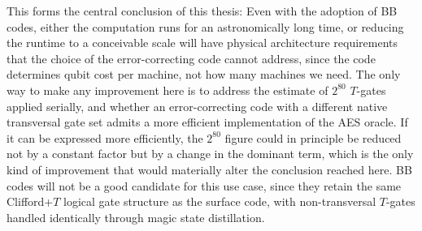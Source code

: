 This forms the central conclusion of this thesis: Even with the adoption of BB codes, either the computation runs for an astronomically long time, or reducing the runtime to a conceivable scale will have physical architecture requirements that the choice of the error-correcting code cannot address, since the code determines qubit cost per machine, not how many machines we need.
The only way to make any improvement here is to address the estimate of $2^{80}$ $T$-gates applied serially, and whether an error-correcting code with a different native transversal gate set admits a more efficient implementation of the AES oracle. If it can be expressed more efficiently, the $2^{80}$ figure could in principle be reduced not by a constant factor but by a change in the dominant term, which is the only kind of improvement that would materially alter the conclusion reached here. BB codes will not be a good candidate for this use case, since they retain the same Clifford+$T$ logical gate structure as the surface code, with non-transversal $T$-gates handled identically through magic state distillation.




